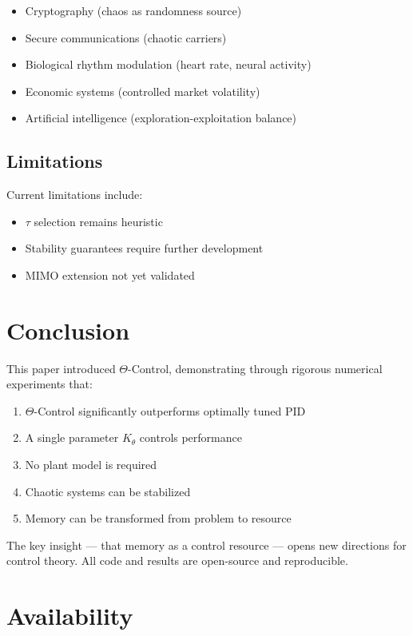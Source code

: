 \documentclass[12pt,a4paper]{article}
\begin{document}
\begin{itemize}
    \item Cryptography (chaos as randomness source)
    \item Secure communications (chaotic carriers)
    \item Biological rhythm modulation (heart rate, neural activity)
    \item Economic systems (controlled market volatility)
    \item Artificial intelligence (exploration-exploitation balance)
\end{itemize}

\subsection{Limitations}

Current limitations include:
\begin{itemize}
    \item $\tau$ selection remains heuristic
    \item Stability guarantees require further development
    \item MIMO extension not yet validated
\end{itemize}

\section{Conclusion}

This paper introduced $\Theta$-Control, demonstrating through 
rigorous numerical experiments that:

\begin{enumerate}
    \item $\Theta$-Control significantly outperforms optimally tuned PID
    \item A single parameter $K_\theta$ controls performance
    \item No plant model is required
    \item Chaotic systems can be stabilized
    \item Memory can be transformed from problem to resource
\end{enumerate}

The key insight — that memory as a control resource — opens 
new directions for control theory. All code and results are 
open-source and reproducible.

\section*{Availability}
\end{document}
